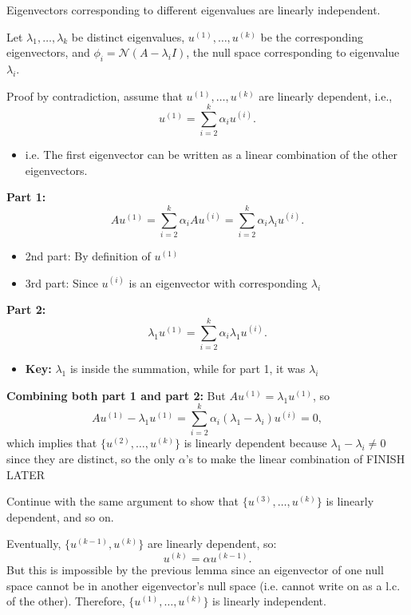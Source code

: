 \begin{theorem}
    Eigenvectors corresponding to different eigenvalues are linearly independent.
\end{theorem}

\begin{derivation}
    Let $\lambda_1, \ldots, \lambda_k$ be distinct eigenvalues, $u^{(1)}, \ldots, u^{(k)}$ be the corresponding eigenvectors, and $\phi_i = \mathcal{N}(A - \lambda_i I)$, the null space corresponding to eigenvalue $\lambda_i$.
    \vspace{1em}

    Proof by contradiction, assume that $u^{(1)}, \ldots, u^{(k)}$ are linearly dependent, i.e.,
    \[
    u^{(1)} = \sum_{i=2}^{k} \alpha_i u^{(i)}.
    \]
    \begin{itemize}
        \item i.e. The first eigenvector can be written as a linear combination of the other eigenvectors. 
    \end{itemize}
    \vspace{1em}

    \textbf{Part 1:}
    \[
    A u^{(1)} = \sum_{i=2}^{k} \alpha_i A u^{(i)} = \sum_{i=2}^{k} \alpha_i \lambda_i u^{(i)}.
    \]
    \begin{itemize}
        \item 2nd part: By definition of $u^{(1)}$
        \item 3rd part: Since $u^{(i)}$ is an eigenvector with corresponding $\lambda_i$
    \end{itemize}

    \textbf{Part 2:}
    \[
    \lambda_1 u^{(1)} = \sum_{i=2}^{k} \alpha_i \lambda_1 u^{(i)}.
    \]
    \begin{itemize}
        \item \textbf{Key:} $\lambda_1$ is inside the summation, while for part 1, it was $\lambda_i$
    \end{itemize}
    \vspace{1em}

    \textbf{Combining both part 1 and part 2:}
    But $A u^{(1)} = \lambda_1 u^{(1)}$, so
    \[
    A u^{(1)} - \lambda_1 u^{(1)} =\sum_{i=2}^{k} \alpha_i (\lambda_1 - \lambda_i) u^{(i)} = 0,
    \]
    which implies that $\{u^{(2)}, \ldots, u^{(k)}\}$ is linearly dependent because $\lambda_1 - \lambda_i \neq 0$ since they are distinct, so the only $\alpha$'s to make the linear combination of FINISH LATER
    \vspace{1em}

    Continue with the same argument to show that $\{u^{(3)}, \ldots, u^{(k)}\}$ is linearly dependent, and so on. 
    \vspace{1em}

    Eventually, $\{u^{(k-1)}, u^{(k)}\}$ are linearly dependent, so:
    \[
    u^{(k)} = \alpha u^{(k-1)}.
    \]
    But this is impossible by the previous lemma since an eigenvector of one null space cannot be in another eigenvector's null space (i.e. cannot write on as a l.c. of the other). Therefore, $\{u^{(1)}, \ldots, u^{(k)}\}$ is linearly independent.    
\end{derivation}

